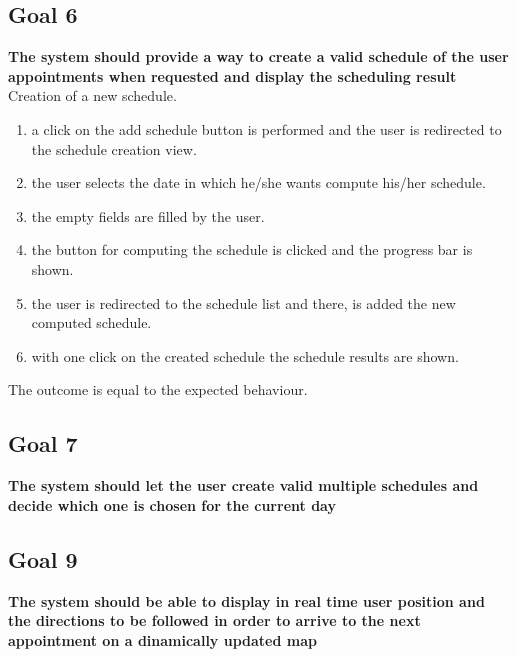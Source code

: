 
\subsection{Goal 6}
\textbf{The system should provide a way to create a valid schedule of the user appointments when requested and display the scheduling result}\\

{Creation of a new schedule.}
{{\begin{enumerate}
\item a click on the add schedule button is performed and the user is redirected to the schedule creation view.
\item the user selects the date in which he/she wants compute his/her schedule.
\item the empty fields are filled by the user.
\item the button for computing the schedule is clicked and the progress bar is shown.
\item the user is redirected to the schedule list and there, is added the new computed schedule.
\item with one click on the created schedule the schedule results are shown.
\end{enumerate}}}
{The outcome is equal to the expected behaviour.}

\subsection{Goal 7}
\textbf{The system should let the user create valid multiple schedules and decide which one is chosen for the current day}\\



\subsection{Goal 9}
\textbf{The system should be able to display in real time user position and the directions to be followed in order to arrive to the next appointment on a dinamically updated map}\\



